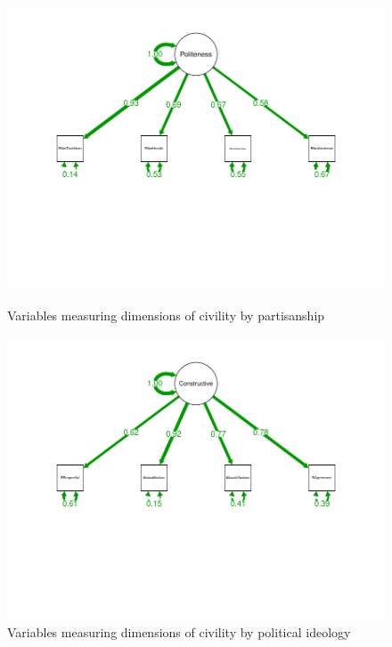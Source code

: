 \documentclass{article}
\begin{document}
\begin{figure}[H]
    \centering
    \includegraphics[width=1\linewidth]{figures/16_FA_Polite.pdf}
    \caption{Variables measuring dimensions of civility by partisanship}
    \label{fig:civility-partisanship}
    \vspace{0.25cm}
    \includegraphics[width=1\linewidth]{figures/16_FA_Constructive.pdf}
    \caption{Variables measuring dimensions of civility by political ideology}
    \label{fig:civility-ideology}
\end{figure}
\end{document}
